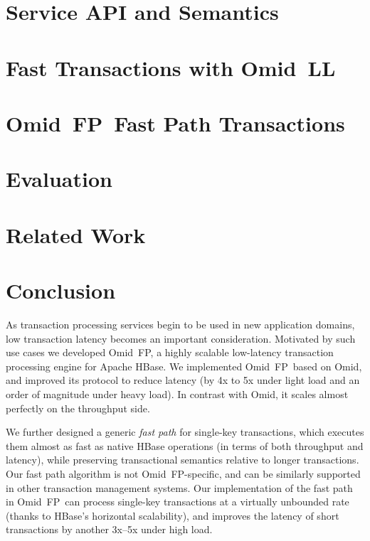 \documentclass[letterpaper,twocolumn,10pt]{article}
\newcommand{\sys}{Omid~FP}
\newcommand{\sysll}{Omid~LL}
\begin{document}
\section{Service API and Semantics} \label{sec:api}


\section{Fast Transactions with \sysll} \label{sec:ll}



\section{\sys\ Fast Path Transactions}
\label{sec:alg}


\section{Evaluation} \label{sec:eval}


\section{Related Work} \label{sec:related}


\section{Conclusion} \label{sec:conclusions}

As transaction processing services begin to be used in new application domains, low 
transaction latency becomes an important consideration. 
Motivated by such use cases we developed \sys, a highly scalable 
low-latency transaction processing engine for Apache HBase. 
We implemented \sys\ based on Omid, and 
improved its protocol to reduce latency (by 4x to 5x under light load
and an order of magnitude under heavy load). In contrast with 
Omid, it scales almost perfectly on the throughput side. 

We further designed a generic \emph{fast path} for single-key transactions, 
which executes them  almost as fast as native HBase operations (in terms of 
both throughput and latency), while preserving
transactional semantics relative to longer transactions.
Our fast path algorithm is not \sys-specific, and can be similarly supported in 
other transaction management systems.
Our implementation of the fast path in \sys\ can process single-key
transactions  at a virtually unbounded rate (thanks to HBase's horizontal 
scalability), and improves the latency of short transactions
by another 3x--5x under high load.
\end{document}
